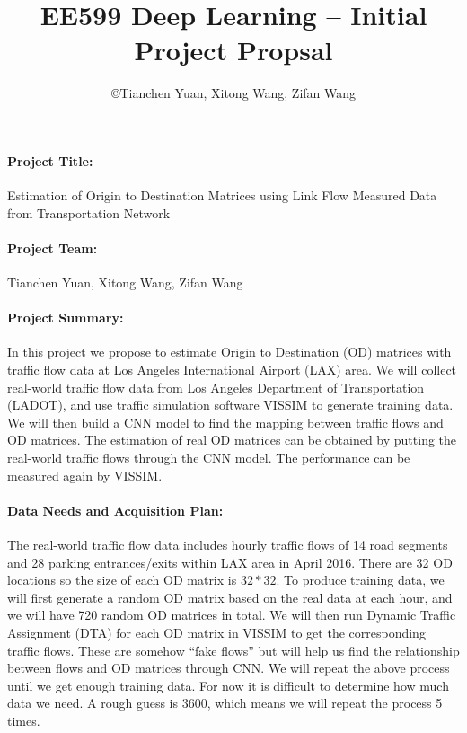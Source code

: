 \documentclass[11pt]{article}
\title{\bf EE599 Deep Learning -- Initial Project Propsal}
\author{\copyright  Tianchen Yuan, Xitong Wang, Zifan Wang}
\begin{document}
\maketitle

\paragraph{Project Title:}  Estimation of Origin to Destination Matrices using Link Flow Measured Data from Transportation Network

\paragraph{Project Team:} Tianchen Yuan, Xitong Wang, Zifan Wang 

\paragraph{Project Summary:} In this project we propose to estimate Origin to Destination (OD) matrices with traffic flow data at Los Angeles International Airport (LAX) area. We will collect real-world traffic flow data from Los Angeles Department of Transportation (LADOT), and use traffic simulation software VISSIM to generate training data. We will then build a CNN model to find the mapping between traffic flows and OD matrices. The estimation of real OD matrices can be obtained by putting the real-world traffic flows through the CNN model. The performance can be measured again by VISSIM.  

\paragraph{Data Needs and Acquisition Plan:} The real-world traffic flow data includes hourly traffic flows of 14 road segments and 28 parking entrances/exits within LAX area in April 2016. There are 32 OD locations so the size of each OD matrix is $32*32$. To produce training data, we will first generate a random OD matrix based on the real data at each hour, and we will have 720 random OD matrices in total. We will then run Dynamic Traffic Assignment (DTA) for each OD matrix in VISSIM to get the corresponding traffic flows. These are somehow “fake flows” but will help us find the relationship between flows and OD matrices through CNN. We will repeat the above process until we get enough training data. For now it is difficult to determine how much data we need. A rough guess is 3600, which means we will repeat the process 5 times. 
\end{document}
